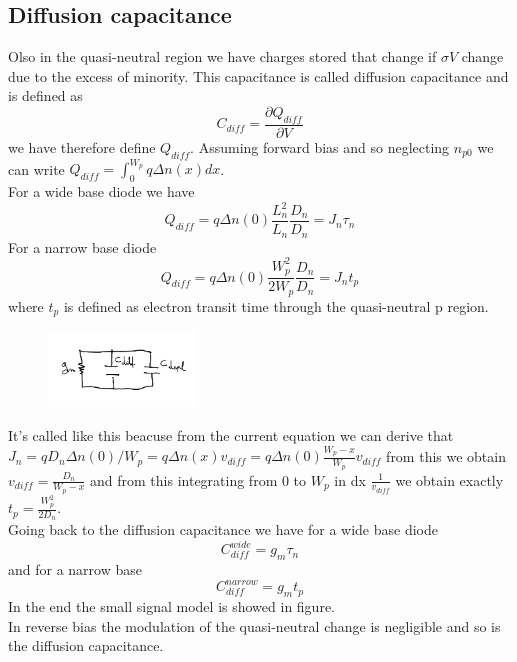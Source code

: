 \subsection{Diffusion capacitance}
Olso in the quasi-neutral region we have charges stored that change if $\sigma V$ change due to the excess of minority. This capacitance is called diffusion capacitance and is defined as 
\begin{equation}
C_{diff}=\frac{\partial Q_{diff}}{\partial V}
\end{equation} 
we have therefore define $Q_{diff}$. Assuming forward bias and so neglecting $n_{p0}$ we can write $Q_{diff}=\int^{W_p}_0 q\Delta n(x) dx$.\\
For a wide base diode we have 
\begin{equation}
Q_{diff}=q\Delta n(0) \frac{L_n^2}{L_n}\frac{D_n}{D_n}=J_n\tau_n
\end{equation}
For a narrow base diode 
\begin{equation}
Q_{diff}=q\Delta n(0) \frac{W_p^2}{2W_p}\frac{D_n}{D_n}=J_nt_p
\end{equation}
where $t_p$ is defined as electron transit time through the quasi-neutral p region.\\

\begin{figure}
\includegraphics[width=0.35\textwidth]{smallpn.png}
\end{figure}

It's called like this beacuse from the current equation we can derive that $J_n=qD_n\Delta n(0)/W_p=q\Delta n(x) v_{diff}=q\Delta n(0)\frac{W_p-x}{W_p} v_{diff}$ from this we obtain $v_{diff}=\frac{D_n}{W_p-x}$ and from this integrating from 0 to $W_p$ in dx $\frac{1}{v_{diff}}$ we obtain exactly $t_p=\frac{W_p^2}{2D_n}$.\\
Going back to the diffusion capacitance we have for a wide base diode
\begin{equation}
C_{diff}^{wide}=g_m\tau_n
\end{equation} 
and for a narrow base
\begin{equation}
C_{diff}^{narrow}=g_mt_p
\end{equation}
In the end the small signal model is showed in figure.\\
In reverse bias the modulation of the quasi-neutral change is negligible and so is the diffusion capacitance.

